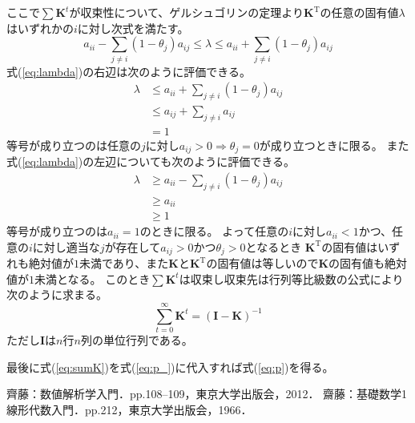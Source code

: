 \documentclass{jarticle}
\numberwithin{equation}{section}
\numberwithin{table}{section}
\theoremstyle{plain}
\begin{document}
ここで$ \sum \bm{K}^t $が収束性について、ゲルシュゴリンの定理\cite{bib:s_saito}より$ \bm{K}^\mathrm{T} $の任意の固有値$ \lambda $はいずれかの$ i $に対し次式を満たす。
\begin{equation}
    \label{eq:lambda}
    a_{i i} - \sum_{j \ne i}(1 - \theta_j) a_{i j} \le \lambda \le a_{i i} + \sum_{j \ne i}(1 - \theta_j) a_{i j}
\end{equation}
式(\ref{eq:lambda})の右辺は次のように評価できる。
\begin{align*}
    \lambda &\le a_{i i} + \sum_{j \ne i}(1 - \theta_j) a_{i j} \\
    &\le a_{i j} + \sum_{j \ne i} a_{i j} \\
    &= 1
\end{align*}
等号が成り立つのは任意の$j$に対し$a_{i j} > 0 \Rightarrow \theta_j = 0$が成り立つときに限る。
また式(\ref{eq:lambda})の左辺についても次のように評価できる。
\begin{align*}
    \lambda &\ge a_{i i} - \sum_{j \ne i}(1 - \theta_j) a_{i j} \\
    &\ge a_{i i} \\
    &\ge 1
\end{align*}
等号が成り立つのは$a_{i i}=1$のときに限る。
よって任意の$i$に対し$a_{i i} < 1$かつ、任意の$i$に対し適当な$j$が存在して$a_{i j} > 0$かつ$\theta_j > 0$となるとき
$ \bm{K}^\mathrm{T} $の固有値はいずれも絶対値が$ 1 $未満であり、また$ \bm{K} $と$ \bm{K}^\mathrm{T} $の固有値は等しいので$ \bm{K} $の固有値も絶対値が$ 1 $未満となる。
このとき$ \sum \bm{K}^t $は収束し収束先は行列等比級数の公式\cite{bib:m_saito}により次のように求まる。
\begin{equation} \label{eq:sumK}
    \sum_{t=0}^{\infty} \bm{K}^t = (\bm{I} - \bm{K})^{-1}
\end{equation}
ただし$ \bm{I} $は$n$行$n$列の単位行列である。

最後に式(\ref{eq:sumK})を式(\ref{eq:p_})に代入すれば式(\ref{eq:p})を得る。\QED

\begin{thebibliography}{99}
    齊藤：数値解析学入門．pp.108--109，東京大学出版会，2012．
    齋藤：基礎数学1　線形代数入門．pp.212，東京大学出版会，1966．
\end{thebibliography}
\end{document}
